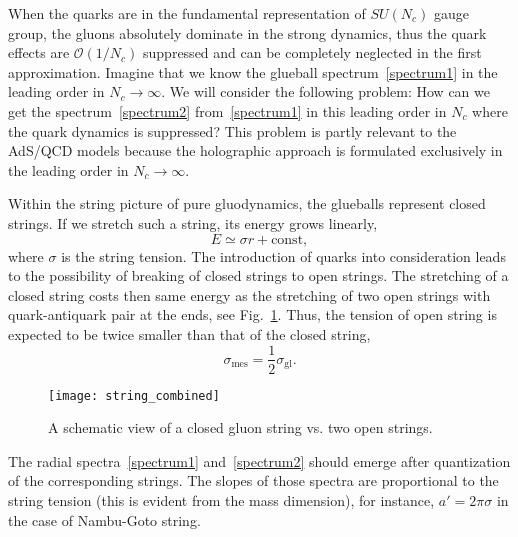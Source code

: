 \documentclass[a4paper,11pt]{article}
\begin{document}
When the quarks are in the fundamental representation of $SU(N_c)$ gauge group, the gluons
absolutely dominate in the strong dynamics, thus the quark effects are $\mathcal{O}(1/N_c)$ suppressed and can be completely neglected
in the first approximation. Imagine that we know the glueball spectrum~\eqref{spectrum1} in the leading
order in \(N_c\to\infty\). We will consider the following problem: How can we get the spectrum~\eqref{spectrum2} from~\eqref{spectrum1}
in this leading order in $N_c$ where the quark dynamics is suppressed? This problem is partly relevant to the AdS/QCD models because the
holographic approach is formulated exclusively in the leading order in \(N_c\to\infty\).

Within the string picture of pure gluodynamics, the glueballs represent closed strings. If we stretch such a string,
its energy grows linearly,
\begin{equation}
\label{pot}
  E\simeq\sigma r + \text{const},
\end{equation}
where \(\sigma\) is the string tension. The introduction of quarks into consideration leads
to the possibility of breaking of closed strings to open strings. The stretching of a closed string costs then same
energy as the stretching of two open strings with quark-antiquark pair at the ends,
see Fig.~\ref{string_fig}. Thus, the tension of open string is expected to be twice
smaller than that of the closed string,
\begin{equation}
\label{rel}
  \sigma_\text{mes}=\frac{1}{2}\sigma_\text{gl}.
\end{equation}

\begin{figure}[b]
  \begin{center}
  \texttt{[image: string\_combined]}
  \end{center}
  \caption{A schematic view of a closed gluon string vs. two open strings.}
  \label{string_fig}
\end{figure}

The radial spectra~\eqref{spectrum1} and~\eqref{spectrum2} should emerge after quantization of the corresponding
strings. The slopes of those spectra are proportional to the string tension (this is evident from the mass dimension),
for instance, $a'=2\pi\sigma$ in the case of Nambu-Goto string.
\end{document}
